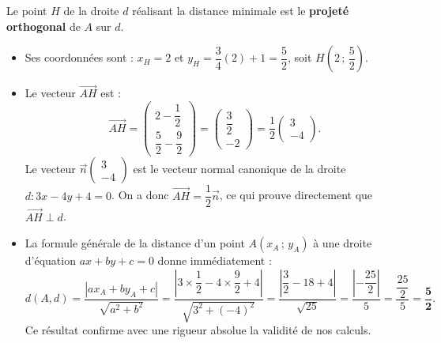\documentclass[11pt,a4paper]{article}
\newcommand{\vect}[1]{\overrightarrow{#1}}
\begin{document}
\begin{remarquebox}
Le point $H$ de la droite $d$ réalisant la distance minimale est le \textbf{projeté orthogonal} de $A$ sur $d$.
\begin{itemize}[leftmargin=*,itemsep=1pt]
    \item Ses coordonnées sont : $x_H = 2$ et $y_H = \dfrac{3}{4}(2) + 1 = \dfrac{5}{2}$, soit $H\left(2\,;\, \dfrac{5}{2}\right)$.
    \item Le vecteur $\vect{AH}$ est :
    \[
    \vect{AH} = \begin{pmatrix} 2 - \dfrac{1}{2} \\ \dfrac{5}{2} - \dfrac{9}{2} \end{pmatrix} = \begin{pmatrix} \dfrac{3}{2} \\ -2 \end{pmatrix} = \frac{1}{2} \begin{pmatrix} 3 \\ -4 \end{pmatrix}.
    \]
    Le vecteur $\vect{n}\begin{pmatrix} 3 \\ -4 \end{pmatrix}$ est le vecteur normal canonique de la droite $d : 3x - 4y + 4 = 0$.
    On a donc $\vect{AH} = \dfrac{1}{2}\vect{n}$, ce qui prouve directement que $\vect{AH} \perp d$.
    \item La formule générale de la distance d'un point $A(x_A\,;\,y_A)$ à une droite d'équation $ax + by + c = 0$ donne immédiatement :
    \[
    d(A, d) = \frac{|ax_A + by_A + c|}{\sqrt{a^2 + b^2}} = \frac{\left|3 \times \dfrac{1}{2} - 4 \times \dfrac{9}{2} + 4\right|}{\sqrt{3^2 + (-4)^2}} = \frac{\left|\dfrac{3}{2} - 18 + 4\right|}{\sqrt{25}} = \frac{\left|-\dfrac{25}{2}\right|}{5} = \frac{\dfrac{25}{2}}{5} = \mathbf{\frac{5}{2}}.
    \]
    Ce résultat confirme avec une rigueur absolue la validité de nos calculs.
\end{itemize}

\begin{center}
\end{center}
\end{remarquebox}
\end{document}
